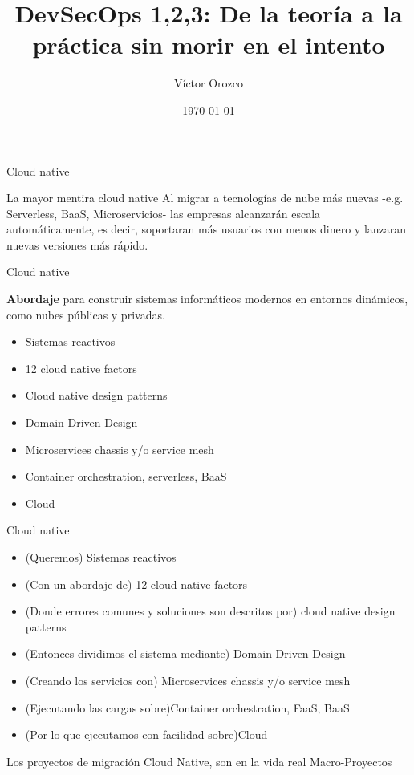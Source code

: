 \documentclass[aspectratio=169]{beamer}
\title{DevSecOps 1,2,3: De la teoría a la práctica sin morir en el intento}
\author{Víctor Orozco}
\date{\today}
\begin{document}
	\begin{frame}
		\maketitle
		
	\end{frame}


\begin{frame}{Cloud native}
	
	\begin{alertblock}{La mayor mentira cloud native}
		Al migrar a tecnologías de nube más nuevas -e.g. Serverless, BaaS, Microservicios- las empresas alcanzarán escala automáticamente, es decir, soportaran más usuarios con menos dinero y lanzaran nuevas versiones más rápido.
	\end{alertblock}
	
	
\end{frame}



\begin{frame}{Cloud native}
	
	\textbf{Abordaje} para construir sistemas informáticos modernos en entornos dinámicos, como nubes públicas y privadas.
	
	\begin{itemize}
		\item Sistemas reactivos
		\item 12 cloud native factors
		\item Cloud native design patterns
		\item Domain Driven Design
		\item Microservices chassis y/o service mesh
		\item Container orchestration, serverless, BaaS
		\item Cloud
	\end{itemize}
	
\end{frame}

\begin{frame}{Cloud native}
	
	\begin{itemize}
		\item (Queremos) Sistemas reactivos
		\item (Con un abordaje de) 12 cloud native factors
		\item (Donde errores comunes y soluciones son descritos por) cloud native design patterns
		\item (Entonces dividimos el sistema mediante) Domain Driven Design
		\item (Creando los servicios con) Microservices chassis y/o service mesh
		\item (Ejecutando las cargas sobre)Container orchestration, FaaS, BaaS
		\item (Por lo que ejecutamos con facilidad sobre)Cloud
	\end{itemize}
	
	Los proyectos de migración Cloud Native, son en la vida real Macro-Proyectos
	
	
\end{frame}
\end{document}
